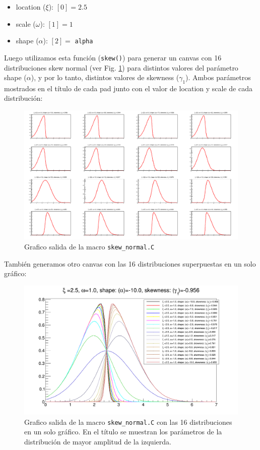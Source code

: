 \documentclass[11pt,letterpaper]{article}
\begin{document}
\begin{itemize}
\item location ($\xi$): $[0]=2.5$
\item scale ($\omega$): $[1]=1$
\item shape ($\alpha$): $[2]=$ \verb|alpha|
\end{itemize}

Luego utilizamos esta función (\verb|skew()|) para generar un canvas con 16 distribuciones skew normal (ver Fig. \ref{skew_normal_dist}) para distintos valores del parámetro shape ($\alpha$), y por lo tanto, distintos valores de skewness ($\gamma_1$). Ambos parámetros mostrados en el título de cada pad junto con el valor de location y scale de cada distribución:

 \begin{figure}[H]
    \includegraphics[width=1.\textwidth]{img/skew_normal_dist.png}
    \centering
     \cprotect\caption{Grafico salida de la macro \verb|skew_normal.C|} 
\label{skew_normal_dist}
\end{figure}



También generamos otro canvas con las 16 distribuciones superpuestas en un solo gráfico:

 \begin{figure}[H]
    \includegraphics[width=1.\textwidth]{img/skew_normal_dist_same.png}
    \centering
     \cprotect\caption{Grafico salida de la macro \verb|skew_normal.C| con las 16 distribuciones en un solo gráfico. En el título se muestran los parámetros de la distribución de mayor amplitud de la izquierda.} 
\label{skew_normal_dist_same}
\end{figure}
\end{document}
